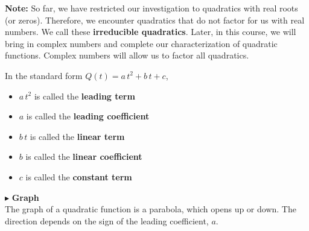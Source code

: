 \documentclass{ximera}
\begin{document}
\textbf{Note:} So far, we have restricted our investigation to quadratics with real roots (or zeros).  Therefore, we encounter quadratics that do not factor for us with real numbers. We call these \textbf{irreducible quadratics}.  Later, in this course, we will bring in complex numbers and complete our characterization of quadratic functions. Complex numbers will allow us to factor all quadratics.




\begin{notation} 

In the standard form $Q(t) = a \, t^2 + b \, t + c  $,


\begin{itemize}
\item $a \, t^2$ is called the \textbf{leading term}
\item $a$ is called the \textbf{leading coefficient}
\item $b \, t$ is called the \textbf{linear term}
\item $b$ is called the \textbf{linear coefficient}
\item $c$ is called the \textbf{constant term}
\end{itemize}





\end{notation}





$\blacktriangleright$ \textbf{\textcolor{red!10!blue!90!}{Graph}} \\ 

The graph of a quadratic function is a parabola, which opens up or down.  The direction depends on the sign of the leading coefficient, $a$.
\end{document}
